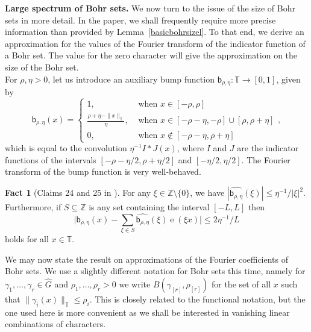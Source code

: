 \documentclass[a4paper,11pt]{article}
\numberwithin{theorem}{section}
\theoremstyle{definition}
\newtheorem{fact}[theorem]{Fact}
\newcommand{\on}[1]{
	\operatorname{#1}
}
\newcommand{\uc}[1]{
    \|#1\|_{\mathbb{T}}
}
\newcommand{\tn}[1]{ %
	\|#1\|_{\mathbb{T}}
}
\begin{document}
\noindent\textbf{Large spectrum of Bohr sets.} We now turn to the issue of the size of Bohr sets in more detail. In the paper, we shall frequently require more precise information than provided by Lemma~\ref{basicbohrsizel}. To that end, we derive an approximation for the values of the Fourier transform of the indicator function of a Bohr set. The value for the zero character will give the approximation on the size of the Bohr set.\\

For $\rho, \eta > 0$, let us introduce an auxiliary bump function $\mathsf{b}_{\rho, \eta} : \mathbb{T} \to [0,1]$, given by 
\begin{equation}\mathsf{b}_{\rho, \eta}(x) = \begin{cases}
1,&\text{ when }x\in [-\rho, \rho]\\
\frac{\rho + \eta - \uc{x}}{\eta}, &\text{ when }x\in [-\rho -\eta, -\rho] \cup [\rho, \rho + \eta]\\
0, & \text{ when }x\notin [-\rho-\eta, \rho+\eta]
\end{cases},\label{bumpdefinition}\end{equation}
which is equal to the convolution $\eta^{-1} I \ast J(x)$, where $I$ and $J$ are the indicator functions of the intervals $[-\rho -\eta/2, \rho + \eta/2]$ and $[-\eta/2, \eta/2]$. The Fourier transform of the bump function is very well-behaved.

\begin{fact}[Claims 24 and 25 in \cite{generalBilBog}]\label{bumpfunctionsfact}
    For any $\xi \in \mathbb{Z}\setminus \{0\}$, we have $|\widehat{\mathsf{b}_{\rho, \eta}}(\xi)| \leq \eta^{-1}/|\xi|^2$. Furthermore, if $S \subseteq \mathbb{Z}$ is any set containing the interval $[-L, L]$ then 
    \[\Big|\mathsf{b}_{\rho, \eta}(x) - \sum_{\xi \in S} \widehat{\mathsf{b}_{\rho, \eta}}(\xi) \on{e}(\xi x)\Big| \leq 2\eta^{-1}/L\]
    holds for all $x \in \mathbb{T}$.
\end{fact}

We may now state the result on approximations of the Fourier coefficients of Bohr sets. We use a slightly different notation for Bohr sets this time, namely for $\gamma_1, \dots, \gamma_r \in \hat{G}$ and $\rho_1, \dots, \rho_r > 0$ we write $B(\gamma_{[r]}, \rho_{[r]})$ for the set of all $x$ such that $\tn{\gamma_i(x)} \leq \rho_i$. This is closely related to the functional notation, but the one used here is more convenient as we shall be interested in vanishing linear combinations of characters.
\end{document}
